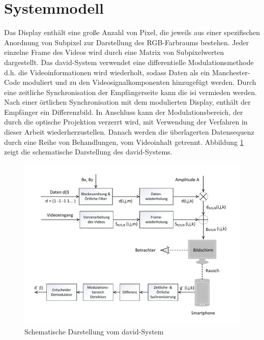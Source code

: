 \section{Systemmodell} 
Das Display enthält eine große Anzahl von Pixel, die jeweils aus einer spezifischen Anordnung von Subpixel zur Darstellung des RGB-Farbraums bestehen. Jeder einzelne Frame des Videos wird durch eine Matrix von Subpixelwerten dargestellt. Das \gls{david}-System verwendet eine differentielle Modulationsmethode d.h. die Videoinformationen wird wiederholt, sodass Daten als ein Manchester-Code moduliert und zu den Videosignalkomponenten hinzugefügt werden. Durch eine zeitliche Synchronisation der Empfängerseite kann die \gls{isi} vermieden werden. Nach einer örtlichen Synchronisation mit dem modulierten Display, enthält der Empfänger ein Differenzbild. In Anschluss kann der Modulationsbereich, der durch die optische Projektion verzerrt wird, mit Verwendung der Verfahren in dieser Arbeit wiederherzustellen. Danach werden die überlagerten Datensequenz durch eine Reihe von Behandlungen, vom Videoinhalt getrennt. Abbildung \ref{fig:David2} zeigt die schematische Darstellung des \gls{david}-Systems. 



\vspace{18pt}

\begin{figure}[H]
	\centering 
	\includegraphics[keepaspectratio,width=1.0\textwidth]{images/2_DaViD/Systemmodell.pdf}
	\caption{Schematische Darstellung vom \gls{david}-System}
	\label{fig:David2}
\end{figure}


